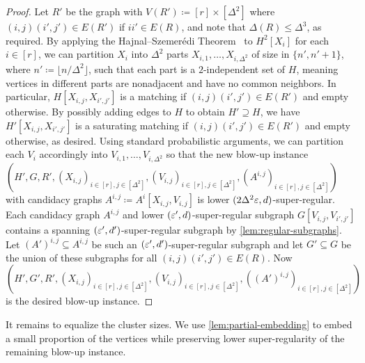 \documentclass[11pt]{amsart}
\begin{document}
\begin{proof}
    Let $R'$ be the graph with $V(R') \coloneqq [r]\times [\Delta^2]$ where $(i,j)(i',j') \in E(R')$ if $ii' \in E(R)$, and note that $\Delta(R) \leq \Delta^3$, as required.  
    By applying the Hajnal--Szemer\'{e}di Theorem~\cite{HS70} to $H^2[X_i]$ for each $i \in [r]$, we can partition $X_i$ into $\Delta^2$ parts $X_{i,1}, \dots, X_{i, \Delta^2}$ of size in $\{n', n' + 1\}$, where $n' \coloneqq \lfloor n / \Delta^2\rfloor$, such that each part is a $2$-independent set of $H$, meaning vertices in different parts are nonadjacent and have no common neighbors.  In particular, $H[X_{i,j}, X_{i',j'}]$ is a matching if $(i,j)(i',j') \in E(R')$ and empty otherwise.  By possibly adding edges to $H$ to obtain $H' \supseteq H$, we have $H'[X_{i,j}, X_{i',j'}]$ is a saturating matching if $(i,j)(i',j') \in E(R')$ and empty otherwise, as desired.
    Using standard probabilistic arguments, we can partition each $V_i$ accordingly into $V_{i,1}, \dots, V_{i,\Delta^2}$ so that the new blow-up instance $(H', G, R', (X_{i,j})_{i\in[r],j\in[\Delta^2]}, (V_{i,j})_{i\in[r],j\in[\Delta^2]}, (A^{i,j})_{i\in[r],j\in[\Delta^2]})$ with candidacy graphs $A^{i,j} \coloneqq A^i[X_{i,j}, V_{i,j}]$ is lower $(2\Delta^2\varepsilon, d)$-super-regular.  Each candidacy graph $A^{i,j}$ and lower $(\varepsilon', d)$-super-regular subgraph $G[V_{i,j}, V_{i', j'}]$ contains a spanning $(\varepsilon', d')$-super-regular subgraph by \cref{lem:regular-subgraphs}.  Let $(A')^{i,j} \subseteq A^{i,j}$ be such an $(\varepsilon', d')$-super-regular subgraph and let $G' \subseteq G$ be the union of these subgraphs for all $(i,j)(i',j')\in E(R)$.
    Now $(H', G', R', (X_{i,j})_{i\in [r],j\in[\Delta^2]}, (V_{i,j})_{i\in [r],j\in[\Delta^2]},\allowbreak ((A')^{i,j})_{i \in [r],j\in[\Delta^2]})$ is the desired blow-up instance.
\end{proof}

It remains to equalize the cluster sizes.  We use
\cref{lem:partial-embedding} to embed a small proportion of the vertices while
preserving lower super-regularity of the remaining blow-up instance.
\end{document}
